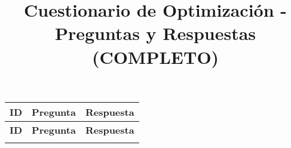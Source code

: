 \documentclass{article}
\title{Cuestionario de Optimización - Preguntas y Respuestas (COMPLETO)}
\author{}
\date{}
\begin{document}
\setlength{\LTpre}{0pt}
\setlength{\LTpost}{0pt}

\maketitle

\begin{longtable}{|>{\centering\arraybackslash}p{1.5cm}|>{\raggedright\arraybackslash}p{14cm}|>{\centering\arraybackslash}p{2cm}|}
\hline
\textbf{ID} & \textbf{Pregunta} & \textbf{Respuesta} \\
\hline
\endfirsthead

\hline
\textbf{ID} & \textbf{Pregunta} & \textbf{Respuesta} \\
\hline
\endhead

\hline
\endfoot

\hline
\endlastfoot


\end{longtable}
\end{document}

